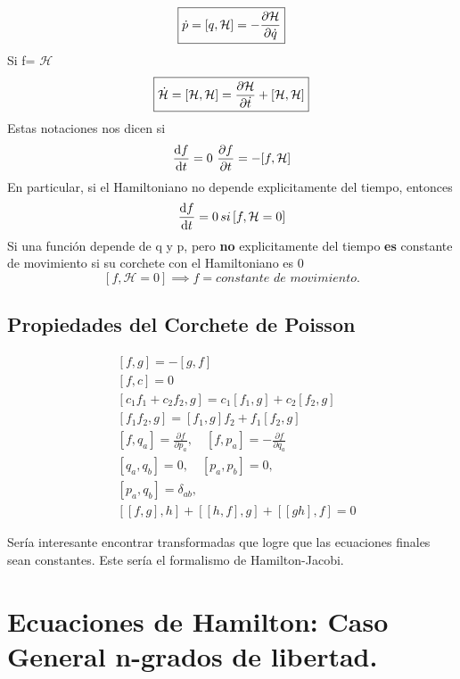 \documentclass[12pt]{article}
\newcommand{\eq}[1]{\[#1\]}
\newcommand{\s}[1]{\section{#1}}
\newcommand{\en}[1]{\[\boxed{#1}\]}
\renewcommand{\ss}[1]{\subsection{#1}}
\newcommand{\rojo}[1]{{\color{rojo}#1}}
\newcommand{\azul}[1]{{\color{azul}#1}}
\begin{document}
\rojo{\en{\dot{p}=[q,\mathcal{H}]= -\pdv{\mathcal{H}}{\dot{q}} }}
Si f= $\mathcal{H}$
\azul{\en{\dot{\mathcal{H}}=[\mathcal{H},\mathcal{H}]= \pdv{\mathcal{H}}{\dot{t}} + [\mathcal{H}, \mathcal{H}]}}
Estas notaciones nos dicen si\\
\begin{align}
\dv{f}{t}	=0\,\, \pdv{f}{t} = -[f, \mathcal{H}]
\end{align}
En particular, si el Hamiltoniano no depende explicitamente del tiempo, entonces
\eq{\dv{f}{t}= 0\, si\, [f, \mathcal{H}=0]}
\rojo{Si una función depende de q y p, pero \textbf{no} explicitamente del tiempo \textbf{es} constante de movimiento si su corchete con el Hamiltoniano es 0}
\en{[f, \mathcal{H}=0] \implies f = \textit{constante de movimiento.}}

\ss{Propiedades del Corchete de Poisson}


\begin{align}
	&{[f, g]=-[g, f]} \\
 &{[f, c]=0} \\
&{\left[c_{1} f_{1}+c_{2} f_{2}, g\right]=c_{1}\left[f_{1}, g\right]+c_{2}\left[f_{2}, g\right]} \\
&{\left[f_{1} f_{2}, g\right]=\left[f_{1}, g\right] f_{2}+f_{1}\left[f_{2}, g\right]} \\
&{\left[f, q_{a}\right]=\frac{\partial f}{\partial p_{a}}, \quad\left[f, p_{a}\right]=-\frac{\partial f}{\partial q_{a}}} \\
&{\left[q_{a}, q_{b}\right]=0, \quad\left[p_{a}, p_{b}\right]=0,} \\
&{\left[p_{a}, q_{b}\right]=\delta_{a b},} \\
&{[[f, g], h]+[[h, f], g]+[[g h], f]=0}
\end{align}


Sería interesante encontrar transformadas que logre que las ecuaciones finales sean constantes. Este sería el formalismo de Hamilton-Jacobi.
\s{Ecuaciones de Hamilton: Caso General n-grados de libertad.}
\end{document}
